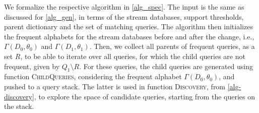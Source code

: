We formalize the respective algorithm in \autoref{alg_spec}. The input is
the same as discussed for \autoref{alg_gen}, in terms of the stream
databases, support thresholds, parent dictionary and the set of matching
queries. The algorithm then initializes the frequent alphabets for the
stream databases before and after the change, i.e., $\Gamma(D_0,\theta_0)$
and $\Gamma(D_1,\theta_1)$. Then, we collect all parents of frequent
queries, as a set $R$, to be able to iterate over all queries, for which the
child queries are not frequent, given by $Q_1 \setminus R$. For these
queries, the child queries are generated using function
\textsc{ChildQueries}, considering the frequent alphabet
$\Gamma(D_0,\theta_0)$, and pushed to a query stack. The latter is used in
function \textsc{Discovery}, from \autoref{alg-discovery}, to explore the
space of candidate queries, starting from the queries on the stack.


